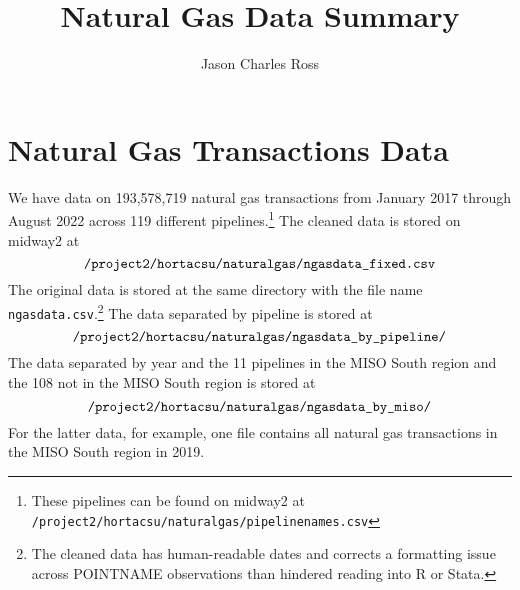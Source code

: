 \documentclass{article}
\title{\textbf{Natural Gas Data Summary}}
\author{Jason Charles Ross}
\newcommand{\1}{\mathbbm{1}}
\theoremstyle{definition}
\begin{document}
\begin{centering}
\maketitle
\end{centering}


\tableofcontents

\section{Natural Gas Transactions Data}

We have data on 193,578,719 natural gas transactions from January 2017 through August 2022 across 119 different pipelines.\footnote{These pipelines can be found on midway2 at \texttt{/project2/hortacsu/naturalgas/pipeline\textunderscore names.csv}} The cleaned data is stored on midway2 at
$$\texttt{/project2/hortacsu/naturalgas/ngasdata\textunderscore fixed.csv}$$
The original data is stored at the same directory with the file name \texttt{ngasdata.csv}.\footnote{The cleaned data has human-readable dates and corrects a formatting issue across POINT\textunderscore NAME observations than hindered reading into R or Stata.} The data separated by pipeline is stored at
$$\texttt{/project2/hortacsu/naturalgas/ngasdata\textunderscore by\textunderscore pipeline/}$$
The data separated by year and the 11 pipelines in the MISO South region and the 108 not in the MISO South region is stored at
$$\texttt{/project2/hortacsu/naturalgas/ngasdata\textunderscore by\textunderscore miso/}$$
For the latter data, for example, one file contains all natural gas transactions in the MISO South region in 2019.
\end{document}

